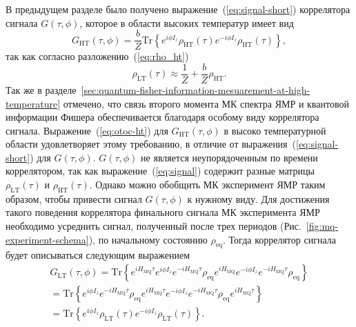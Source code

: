 В предыдущем разделе было получено выражение~(\ref{eq:signal-short}) коррелятора сигнала $G(\tau, \phi)$,
которое в области высоких температур имеет вид
%
\begin{equation}
    \label{eq:otoc-ht}
    G_\mathrm{HT}(\tau, \phi) = \frac b Z\mathrm{Tr}\left\{
    e^{i \phi I_z}
    \rho_\mathrm{HT} (\tau)
    e^{-i \phi I_z}
    \rho_\mathrm{HT}(\tau)
    \right\},
\end{equation}
%
так как согласно разложению~(\ref{eq:rho_ht})
%
\begin{equation}
  \rho_\mathrm{LT} (\tau) \approx \frac 1 Z + \frac b Z \rho_\mathrm{HT}.
\end{equation}
%
Так же в разделе~\ref{sec:quantum-fisher-information-mesuarement-at-high-temperature} отмечено,
что связь второго момента МК спектра ЯМР и квантовой информации Фишера
обеспечивается благодаря особому виду коррелятора сигнала.
Выражение~(\ref{eq:otoc-ht}) для $G_\mathrm{HT}(\tau, \phi)$
в высоко температурной области
удовлетворяет этому требованию,
в отличие от выражения~(\ref{eq:signal-short}) для $G(\tau, \phi)$.
$G(\tau, \phi)$ не является неупорядоченным по времени коррелятором,
так как выражение~(\ref{eq:signal}) содержит разные матрицы $\rho_\mathrm{LT}(\tau)$ и $\rho_\mathrm{HT}(\tau)$.
Однако можно обобщить МК эксперимент ЯМР  таким образом,
чтобы привести сигнал $G(\tau, \phi)$ к нужному виду.
Для достижения такого поведения коррелятора финального сигнала МК эксперимента ЯМР
необходимо усреднить сигнал,
полученный после трех периодов %
(Рис.~\ref{fig:mq-experiment-schema}),
по начальному состоянию $\rho_\mathrm{eq}$.
Тогда коррелятор сигнала будет описываться следующим выражением
%
\begin{multline}
  \label{eq:otoc_LT}
  G_\mathrm{LT}(\tau, \phi) =
  \mathrm{Tr}\left\{
    e^{i H_{\mathrm{MQ}} \tau}
    e^{i \phi I_z}
    e^{-i H_{\mathrm{MQ}} \tau}
    \rho_{\mathrm{eq}}
    e^{i H_{\mathrm{MQ}}}
    e^{-i \phi I_z}
    e^{-i H_{\mathrm{MQ}} \tau}
    \rho_{\mathrm{eq}}
  \right\} \\ =
  \mathrm{Tr}\left\{
    e^{i \phi I_z}
    e^{-i H_\mathrm{MQ} \tau}
    \rho_\mathrm{eq}
    e^{i H_\mathrm{MQ} \tau}
    e^{-i \phi I_z}
    e^{-i H_\mathrm{MQ} \tau}
    \rho_{\mathrm{eq}}
    e^{i H_\mathrm{MQ} \tau}
  \right\} \\ =
  \mathrm{Tr}\left\{
    e^{i \phi I_z}
    \rho_\mathrm{LT} (\tau)
    e^{-i \phi I_z}
    \rho_\mathrm{LT} (\tau)
  \right\}.
\end{multline}
